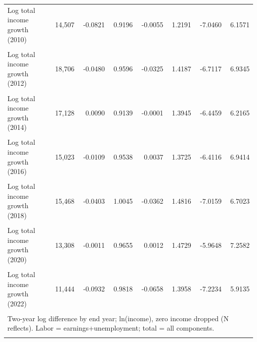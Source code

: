 \begin{table}[htbp]
{\begin{tabular}{lrrrrrrr}
Log total income growth (2010) & 14,507 & -0.0821 & 0.9196 & -0.0055 & 1.2191 & -7.0460 & 6.1571 \\\\
Log total income growth (2012) & 18,706 & -0.0480 & 0.9596 & -0.0325 & 1.4187 & -6.7117 & 6.9345 \\\\
Log total income growth (2014) & 17,128 & 0.0090 & 0.9139 & -0.0001 & 1.3945 & -6.4459 & 6.2165 \\\\
Log total income growth (2016) & 15,023 & -0.0109 & 0.9538 & 0.0037 & 1.3725 & -6.4116 & 6.9414 \\\\
Log total income growth (2018) & 15,468 & -0.0403 & 1.0045 & -0.0362 & 1.4816 & -7.0159 & 6.7023 \\\\
Log total income growth (2020) & 13,308 & -0.0011 & 0.9655 & 0.0012 & 1.4729 & -5.9648 & 7.2582 \\\\
Log total income growth (2022) & 11,444 & -0.0932 & 0.9818 & -0.0658 & 1.3958 & -7.2234 & 5.9135 \\\\
\bottomrule
\multicolumn{8}{l}{\footnotesize Two-year log difference by end year; ln(income), zero income dropped (N reflects). Labor = earnings+unemployment; total = all components.} \\\\
\end{tabular}}
\end{table}
